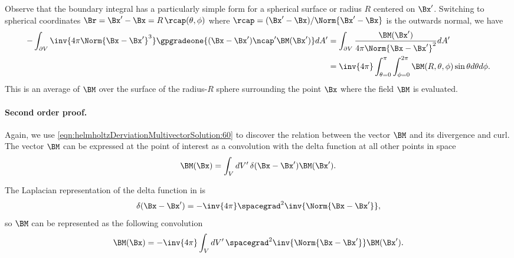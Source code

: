 Observe that the boundary integral has a particularly simple form for a spherical surface or radius \( R \) centered on \( \Bx' \).
Switching to spherical coordinates \( \Br = \Bx' - \Bx = R\, \rcap(\theta, \phi) \) where \( \rcap = (\Bx' - \Bx)/\Norm{\Bx' - \Bx} \) is the outwards normal, we have
\begin{equation}\label{eqn:helmholtzDerviationMultivectorSolution:840}
\begin{aligned}
-
\int_{\partial V}
\inv{4 \pi \Norm{\Bx - \Bx'}^3 }
\gpgradeone{ (\Bx - \Bx') \ncap' \BM(\Bx') } dA'
&= \int_{\partial V} \frac{\BM(\Bx')}{4 \pi \Norm{\Bx - \Bx'}^2 } dA' \\
&= \inv{4\pi} \int_{\theta = 0}^\pi \int_{\phi = 0}^{2 \pi} \BM(R, \theta, \phi) \sin\theta d\theta d\phi.
\end{aligned}
\end{equation}
This is an average of \( \BM \) over the surface of the radius-\(R\) sphere surrounding the point \( \Bx \) where the field \( \BM \) is evaluated.

\paragraph{Second order proof.}

%
%
%

Again, we use \cref{eqn:helmholtzDerviationMultivectorSolution:60}
to discover the relation between the vector \( \BM \) and its divergence and curl.
The vector \( \BM \) can be expressed at the point of interest as a convolution with the delta function at all other points in space
\begin{equation}\label{eqn:helmholtzDerviationMultivectorSolution:80}
\BM(\Bx) = \int_V dV'\, \delta(\Bx - \Bx') \BM(\Bx').
\end{equation}

The Laplacian representation of the delta function in  is
\begin{equation}\label{eqn:helmholtzDerviationMultivectorSolution:100}
\delta(\Bx - \Bx') = -\inv{4\pi} \spacegrad^2 \inv{\Norm{\Bx - \Bx'}},
\end{equation}
so \( \BM \) can be represented as the following convolution
\begin{equation}\label{eqn:helmholtzDerviationMultivectorSolution:120}
\BM(\Bx) = -\inv{4\pi} \int_V dV'\, \spacegrad^2 \inv{\Norm{\Bx - \Bx'}} \BM(\Bx').
\end{equation}

